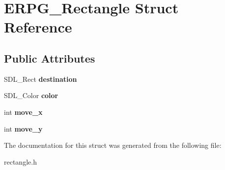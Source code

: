 \hypertarget{structERPG__Rectangle}{\section{E\-R\-P\-G\-\_\-\-Rectangle Struct Reference}
\label{structERPG__Rectangle}
}
\subsection*{Public Attributes}
\begin{DoxyCompactItemize}
\item 
\hypertarget{structERPG__Rectangle_ab9991470290f5d5489cd9d79ac88dda2}{S\-D\-L\-\_\-\-Rect {\bfseries destination}}\label{structERPG__Rectangle_ab9991470290f5d5489cd9d79ac88dda2}

\item 
\hypertarget{structERPG__Rectangle_ad132d56d26f7bb02019af1d70db35e78}{S\-D\-L\-\_\-\-Color {\bfseries color}}\label{structERPG__Rectangle_ad132d56d26f7bb02019af1d70db35e78}

\item 
\hypertarget{structERPG__Rectangle_a7ebfb7f2614702e91708eaa03a5f8132}{int {\bfseries move\-\_\-x}}\label{structERPG__Rectangle_a7ebfb7f2614702e91708eaa03a5f8132}

\item 
\hypertarget{structERPG__Rectangle_ac211b35b131506cdc54fa32d5ec1d651}{int {\bfseries move\-\_\-y}}\label{structERPG__Rectangle_ac211b35b131506cdc54fa32d5ec1d651}

\end{DoxyCompactItemize}


The documentation for this struct was generated from the following file\-:\begin{DoxyCompactItemize}
\item 
rectangle.\-h\end{DoxyCompactItemize}
